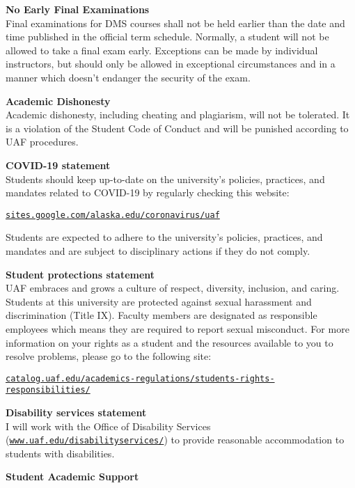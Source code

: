 \documentclass[12pt]{article}
\renewcommand{\emph}[1]{\textsf{\textbf{#1}}}
\newcommand{\localhead}[1]{\par\smallskip\textbf{#1} \smallskip\nobreak\\}%
\def\subheading#1{\localhead{\emph{#1}}}
\begin{document}
\subheading{No Early Final Examinations}
Final examinations for DMS
  courses shall not be held earlier than the date and time published
  in the official term schedule. Normally, a student will not be
  allowed to take a final exam early. Exceptions can be made by
  individual instructors, but should only be allowed in exceptional
  circumstances and in a manner which doesn't endanger the security of
  the exam.

\subheading{Academic Dishonesty}
Academic dishonesty, including cheating and plagiarism, will not
be tolerated.  It is a violation of the Student Code of Conduct
and will be punished according to UAF procedures.

 
\subheading{COVID-19 statement}
Students should keep up-to-date on the university's policies, practices, and mandates related to COVID-19 by regularly checking this website:

\href{https://sites.google.com/alaska.edu/coronavirus/uaf?authuser=0}{\texttt{sites.google.com/alaska.edu/coronavirus/uaf}}

Students are expected to adhere to the university's policies, practices, and mandates and are subject to disciplinary actions if they do not comply.

\subheading{Student protections statement}
UAF embraces and grows a culture of respect, diversity, inclusion, and caring. Students at this university are protected against sexual harassment and discrimination (Title IX). Faculty members are designated as responsible employees which means they are required to report sexual misconduct. For more information on your rights as a student and the resources available to you to resolve problems, please go to the following site:

\href{https://catalog.uaf.edu/academics-regulations/students-rights-responsibilities/}{\texttt{catalog.uaf.edu/academics-regulations/students-rights-responsibilities/}}

\subheading{Disability services statement}
I will work with the Office of Disability Services (\href{https://www.uaf.edu/disabilityservices/}{\texttt{www.uaf.edu/disabilityservices/}}) to provide reasonable accommodation to students with disabilities.

\subheading{Student Academic Support}
\end{document}
